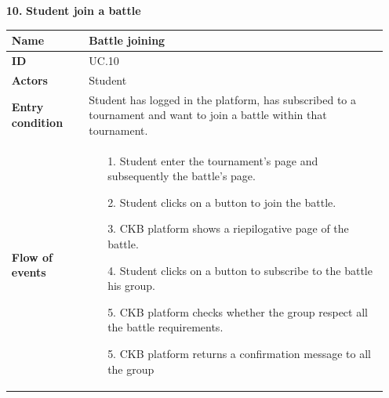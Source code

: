 \documentclass{article}
\begin{document}
{\begin{enumerate}
                    \item[\textbf{10.}] \textbf{Student join a battle}
                    \begin{xltabular}{\textwidth}
                        {| >{\raggedright\arraybackslash}g | >{\raggedright\arraybackslash}X |}      
                        \hline
                        \endfirsthead
                        \hline
                        \endhead
                        \endfoot
                        \hline
                        \endlastfoot
                        

                        
                        
                        \textbf{Name} & Battle joining\\
                        \hline
                        \textbf{ID} & UC.10\\
                        \hline
                        \textbf{Actors} & Student\\
                        \hline
                        \textbf{Entry condition} & Student has logged in the platform, has subscribed to a 
                        tournament and want to join a battle within that tournament.\\
                        \hline
                        \textbf{Flow of events} &    \begin{enumerate}
                                                        \item[1.] Student enter the tournament's page and  
                                                        subsequently the battle's page.
                                                        \item[2.] Student clicks on a button to join the battle.
                                                        \item[3.] CKB platform shows a riepilogative page of 
                                                        the battle. 
                                                        \item[4.] Student clicks on a button to subscribe to the
                                                        battle his group.
                                                        \item[5.] CKB platform checks whether the group respect all the
                                                        battle requirements.
                                                        \item[5.] CKB platform returns a confirmation message to all the group

\end{enumerate}
\end{xltabular}
\end{enumerate}}
\end{document}
